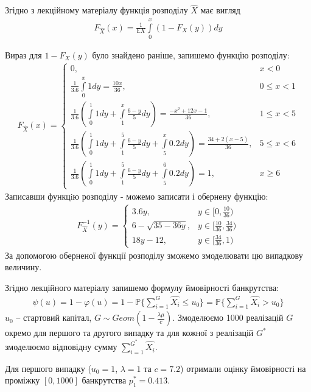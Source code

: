 \documentclass{article}
\renewcommand{\P}{\mathbb{P}}
\newcommand{\E}{\mathbb{E}}
\newcommand{\intl}{\int\limits}
\newcommand{\suml}{\sum\limits}
\begin{document}
    Згідно з лекційному матеріалу функція розподілу $\hat{X}$ має вигляд 
    \begin{gather}
        F_{\hat{X}}(x) = \frac{1}{\E X} \intl_0^x(1 - F_X(y))dy
    \end{gather}

    Вираз для $1 - F_X(y)$ було знайдено раніше, запишемо функцію розподілу:
    \begin{gather}
        F_{\hat{X}}(x) = 
        \begin{cases}
            0, & x < 0\\
            \frac{1}{3.6}\intl_0^x 1dy = \frac{10x}{36}, & 0 \leq x < 1 \\
            \frac{1}{3.6}(\intl_0^1 1dy +\intl_1^x \frac{6-y}{5}dy) = \frac{-x^2 + 12x - 1}{36},& 1 \leq x < 5 \\
            \frac{1}{3.6}(\intl_0^1 1dy +\intl_1^5 \frac{6-y}{5}dy +\intl_5^x 0.2dy) = \frac{34 + 2(x-5)}{36},& 5 \leq x < 6 \\
            \frac{1}{3.6}(\intl_0^1 1dy +\intl_1^5 \frac{6-y}{5}dy +\intl_5^6 0.2dy) = 1,& x \geq 6
        \end{cases}
    \end{gather}
    Записавши функцiю розподілу - можемо записати і обернену функцію:
    \begin{gather}
        F^{-1}_{\hat{X}} (y) = 
        \begin{cases}
            3.6y, & y \in [0, \frac{10}{36}) \\
            6 - \sqrt{35 - 36y}, & y \in [\frac{10}{36}, \frac{34}{36}) \\
            18y - 12, & y \in [\frac{34}{36}, 1)
        \end{cases}
    \end{gather}
    За допомогою оберненої функції розподілу зможемо змоделювати цю випадкову величину.

    Згідно лекційного матеріалу запишемо формулу ймовірності банкрутства:
    \begin{gather}
        \psi(u) = 1 - \varphi(u) = 1 - \P\{\suml_{i=1}^G\hat{X_i} \leq u_0\} = \P\{\suml_{i=1}^G\hat{X_i} > u_0\}
    \end{gather}
    $u_0$ -- стартовий капітал, $G \sim Geom(1 - \frac{\lambda\mu}{c})$.
    Змоделюємо 1000 реалізацій $G$ окремо для першого та другого випадку та для кожної з реалізацій $G^*$ змоделюємо 
    відповідну сумму $\suml_{i=1}^{G^*}\hat{X_i}$. 

    Для першого випадку ($u_0 = 1$, $\lambda = 1$ та $c = 7.2$) 
    отримали оцінку ймовірності на проміжку $[0, 1000]$
    банкрутства $p^*_1 =  0.413$.
\end{document}
